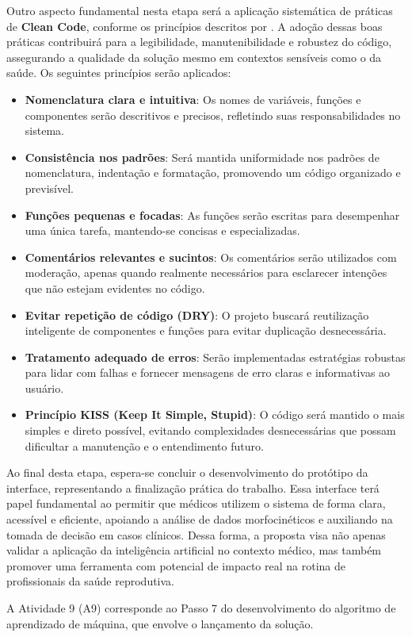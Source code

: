 Outro aspecto fundamental nesta etapa será a aplicação sistemática de práticas de \textbf{Clean Code}, conforme os princípios descritos por . A adoção dessas boas práticas contribuirá para a legibilidade, manutenibilidade e robustez do código, assegurando a qualidade da solução mesmo em contextos sensíveis como o da saúde. Os seguintes princípios serão aplicados:

\begin{itemize}
  \item \textbf{Nomenclatura clara e intuitiva}: Os nomes de variáveis, funções e componentes serão descritivos e precisos, refletindo suas responsabilidades no sistema.
  
  \item \textbf{Consistência nos padrões}: Será mantida uniformidade nos padrões de nomenclatura, indentação e formatação, promovendo um código organizado e previsível.

  \item \textbf{Funções pequenas e focadas}: As funções serão escritas para desempenhar uma única tarefa, mantendo-se concisas e especializadas.

  \item \textbf{Comentários relevantes e sucintos}: Os comentários serão utilizados com moderação, apenas quando realmente necessários para esclarecer intenções que não estejam evidentes no código.

  \item \textbf{Evitar repetição de código (DRY)}: O projeto buscará reutilização inteligente de componentes e funções para evitar duplicação desnecessária.

  \item \textbf{Tratamento adequado de erros}: Serão implementadas estratégias robustas para lidar com falhas e fornecer mensagens de erro claras e informativas ao usuário.

  \item \textbf{Princípio KISS (Keep It Simple, Stupid)}: O código será mantido o mais simples e direto possível, evitando complexidades desnecessárias que possam dificultar a manutenção e o entendimento futuro.
\end{itemize}

Ao final desta etapa, espera-se concluir o desenvolvimento do protótipo da interface, representando a finalização prática do trabalho. Essa interface terá papel fundamental ao permitir que médicos utilizem o sistema de forma clara, acessível e eficiente, apoiando a análise de dados morfocinéticos e auxiliando na tomada de decisão em casos clínicos. Dessa forma, a proposta visa não apenas validar a aplicação da inteligência artificial no contexto médico, mas também promover uma ferramenta com potencial de impacto real na rotina de profissionais da saúde reprodutiva.

A Atividade 9 (A9) corresponde ao Passo 7 do desenvolvimento do algoritmo de aprendizado de máquina, que envolve o lançamento da solução.